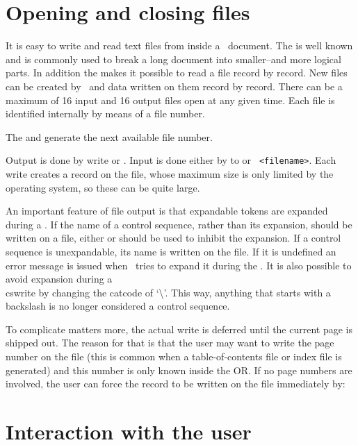 \section{Opening and closing files}

It is easy to write and read text files from inside a \tex\  document. The \cmd{} is well known and is commonly used
to break a long document into smaller--and more logical parts. In addition the \cmd{\read} makes it  possible to
read a file record by record. New files can be created by \tex\ and data written on them record by record. There can be
a maximum of 16 input and 16 output files open at any given time. Each file is identified  internally by means of a file number. 


The \cmd{\newread} and \cmd{\newwrite} generate the next available file number. 



Output is done by write or \cmd{\immediate}\cmd{\write}. Input is done either by  to or 
\verb+ <filename>+. Each write creates a record on the file, whose maximum size is only limited by the operating system, so these can be quite large.

An important feature of file output is that expandable tokens are expanded during a . If the
name of a control sequence, rather than its expansion, should be written on a file, either
\cmd{\noexpand} or \cmd{\string} should be used to inhibit the expansion. If a control sequence is unexpandable,
its name is written on the file. If it is undefined an error message is issued when \tex\ tries to expand it during
the \cmd{\write}. It is also possible to avoid expansion during a \\cs{write} by changing the catcode of `\textbackslash'.
This way, anything that starts with a backslash is no longer considered a control sequence.

To complicate matters more, the actual write is deferred until the current page is shipped out. The reason for that is that the user may want to write the page number on the file (this is common when a table-of-contents file or index file is generated) and this number is only known inside the OR. If no page numbers are involved, the user can force the record to be written on the file immediately by:

\begin{teXXX}
  \immediate\write
\end{teXXX}

\section{Interaction with the user}

